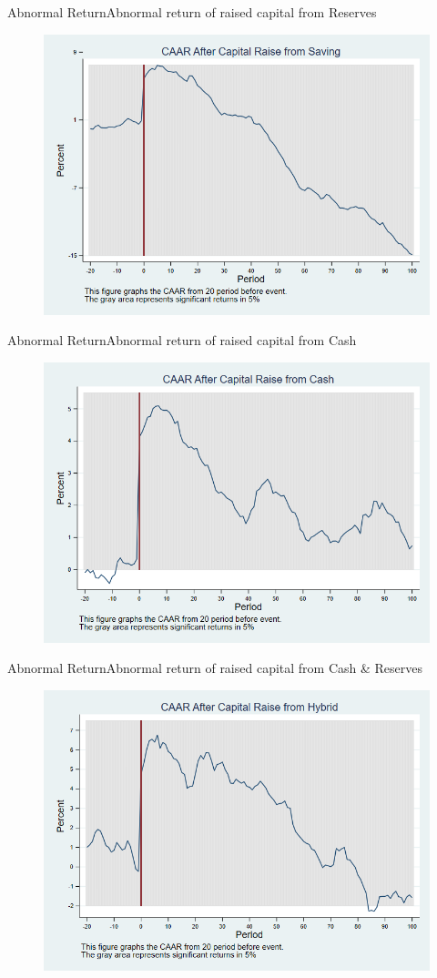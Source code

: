 \documentclass{beamer}
\begin{document}
\begin{frame}{Abnormal Return}{Abnormal return of raised capital from Reserves}
	\label{car_marketmodelSaving}
	\begin{figure}
		\centering
		\includegraphics[width=0.65\linewidth]{Output/car_marketmodelSaving.png}
		\label{fig:car_marketmodelSaving}
	\end{figure}
\end{frame}


\begin{frame}{Abnormal Return}{Abnormal return of raised capital from Cash}
	\label{car_marketmodelCash}
	\begin{figure}
		\centering
		\includegraphics[width=0.65\linewidth]{Output/car_marketmodelCash.png}
		\label{fig:car_marketmodelCash}
	\end{figure}
	
\end{frame}

\begin{frame}{Abnormal Return}{Abnormal return of raised capital from Cash \& Reserves}
	\label{car_marketmodelHybrid}
	\begin{figure}
		\centering
		\includegraphics[width=0.65\linewidth]{Output/car_marketmodelHybrid.png}
		\label{fig:car_marketmodelHybrid}
	\end{figure}
\end{frame}
\end{document}
